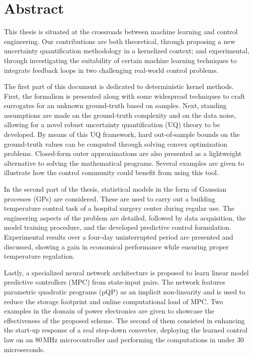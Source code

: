 

\cleardoublepage
\chapter*{Abstract}
This thesis is situated at the crossroads between machine learning and control engineering. Our contributions are both theoretical, through proposing a new uncertainty quantification methodology in a kernelized context; and experimental, through investigating the suitability of certain machine learning techniques to integrate feedback loops in two challenging real-world control problems.

The first part of this document is dedicated to deterministic kernel methods. First, the formalism is presented along with some widespread techniques to craft surrogates for an unknown ground-truth based on samples. Next, standing assumptions are made on the ground-truth complexity and on the data noise, allowing for a novel robust uncertainty quantification (UQ) theory to be developed. By means of this UQ framework, hard out-of-sample bounds on the ground-truth values can be computed through solving convex optimization problems. Closed-form outer approximations are also presented as a lightweight alternative to solving the mathematical programs. Several examples are given to illustrate how the control community could benefit from using this tool.

In the second part of the thesis, statistical models in the form of Gaussian processes (GPs) are considered. These are used to carry out a building temperature control task of a hospital surgery center during regular use. The engineering aspects of the problem are detailed, followed by data acquisition, the model training procedure, and the developed predictive control formulation. Experimental results over a four-day uninterrupted period are presented and discussed, showing a gain in economical performance while ensuring proper temperature regulation. 

Lastly, a specialized neural network architecture is proposed to learn linear model predictive controllers (MPC) from state-input pairs. The network features parametric quadratic programs (pQP) as an implicit non-linearity and is used to reduce the storage footprint and online computational load of MPC. Two examples in the domain of power electronics are given to showcase the effectiveness of the proposed scheme. The second of them consisted in enhancing the start-up response of a real step-down converter, deploying the learned control law on an 80$\,$MHz microcontroller and performing the computations in under $30\,$ microseconds.


